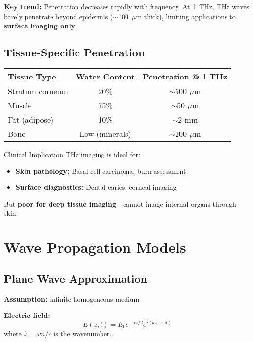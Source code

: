 \begin{keyconcept}
\textbf{Key trend:} Penetration decreases rapidly with frequency. At 1~THz, THz waves barely penetrate beyond epidermis ($\sim$100~$\mu$m thick), limiting applications to \textbf{surface imaging only}.
\end{keyconcept}

\subsection{Tissue-Specific Penetration}
\label{subsec:tissue-specific}

\begin{center}
\begin{tabular}{@{}lcc@{}}
\toprule
Tissue Type & Water Content & Penetration @ 1 THz \\
\midrule
Stratum corneum & 20\% & $\sim$500 $\mu$m \\
Muscle & 75\% & $\sim$50 $\mu$m \\
Fat (adipose) & 10\% & $\sim$2 mm \\
Bone & Low (minerals) & $\sim$200 $\mu$m \\
\bottomrule
\end{tabular}
\end{center}

\begin{calloutbox}{Clinical Implication}
THz imaging is ideal for:
\begin{itemize}
\item \textbf{Skin pathology:} Basal cell carcinoma, burn assessment
\item \textbf{Surface diagnostics:} Dental caries, corneal imaging
\end{itemize}
But \textbf{poor for deep tissue imaging}---cannot image internal organs through skin.
\end{calloutbox}

\section{Wave Propagation Models}
\label{sec:propagation-models}

\subsection{Plane Wave Approximation}
\label{subsec:plane-wave}

\textbf{Assumption:} Infinite homogeneous medium

\textbf{Electric field:}
\begin{equation}
\label{eq:plane-wave}
E(z,t) = E_0 e^{-\alpha z/2} e^{i(kz - \omega t)}
\end{equation}
where $k = \omega n/c$ is the wavenumber.

